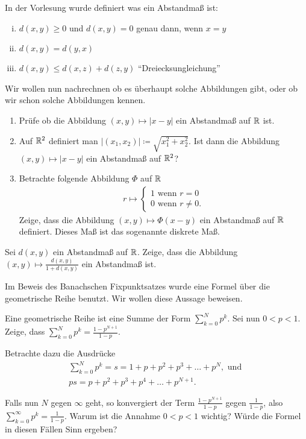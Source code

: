 \documentclass[a4paper,10pt]{article}
\begin{document}
\begin{Aufg}
 In der Vorlesung wurde definiert was ein Abstandmaß ist:
 \begin{enumerate}[(i)]
  \item $d(x, y) \geq 0 $ und $d(x,y) =0$ genau dann, wenn $x=y$
  \item $d(x,y) = d(y,x)$
  \item $d(x,y) \leq d(x,z) + d(z,y)$ ``Dreiecksungleichung''
 \end{enumerate}
 
 Wir wollen nun nachrechnen ob es überhaupt solche Abbildungen gibt,
 oder ob wir schon solche Abbildungen kennen. 
 \begin{enumerate}
  \item Prüfe ob die Abbildung $(x,y) \mapsto |x-y|$ ein Abstandmaß auf $\mathbb{R}$ ist.
  \item Auf $\mathbb{R}^2$ definiert man $|(x_1, x_2)| \coloneqq \sqrt{x_1 ^2 + x_2 ^2}$.
	Ist dann die Abbildung $(x,y) \mapsto |x-y|$ ein Abstandmaß auf $\mathbb{R}^2$?
  \item Betrachte folgende Abbildung $\Phi$ auf $\mathbb{R}$ 
  \begin{gather*}
   r\mapsto \begin{cases}
            1  \text{ wenn } r=0 \\
            0  \text{ wenn } r\neq0.
            \end{cases}
  \end{gather*}
 Zeige, dass die Abbildung $(x,y) \mapsto \Phi(x-y)$ ein Abstandmaß auf $\mathbb{R}$ definiert. 
 Dieses Maß ist das sogenannte diskrete Maß.
  
 \end{enumerate}

\end{Aufg}
 
\begin{Aufg}
Sei $d(x,y)$ ein Abstandmaß auf $\mathbb{R}$. Zeige, dass die Abbildung
 $(x,y) \mapsto \frac{d(x,y)}{1 + d(x,y)}$ ein Abstandmaß ist.
\end{Aufg}


\begin{Aufg}
Im Beweis des Banachschen Fixpunktsatzes wurde eine Formel über die geometrische Reihe
benutzt. Wir wollen diese Aussage beweisen.

Eine geometrische Reihe ist eine Summe der Form $\sum_{k=0}^N p^k$. Sei nun \linebreak $0<p<1$.
Zeige, dass $\sum_{k=0}^N p^k=  \frac{1- p^{N+1}}{1 - p}$.

Betrachte dazu die Ausdrücke 
\begin{gather*}
 \sum_{k=0}^N p^k= s = 1 + p + p^2 + p^3 + \dots + p^N, \text{ und }\\
 ps =p +p^2 +p^3 + p^4 + \dots + p^{N+1}.
\end{gather*}

Falls nun $N$ gegen $\infty$ geht, so konvergiert der Term $\frac{1- p^{N+1}}{1 - p}$
gegen $\frac{1}{1 - p}$, also $\sum_{k=0}^\infty p^k=  \frac{1}{1 - p}$.
Warum ist die Annahme $0<p<1$ wichtig? Würde die Formel in diesen Fällen Sinn ergeben?
\end{Aufg}
\end{document}
